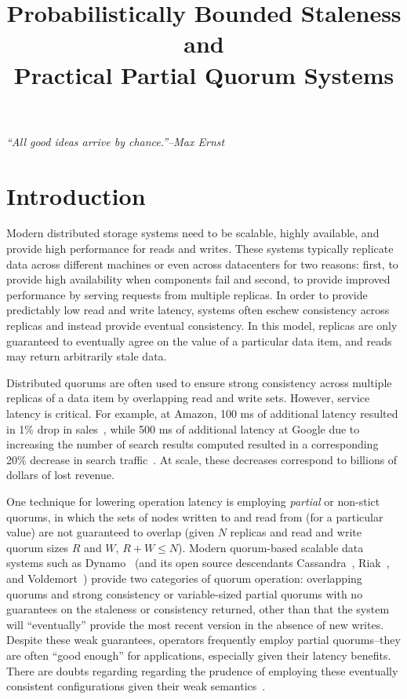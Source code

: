 \documentclass{vldb}
\title{Probabilistically Bounded Staleness and\\ Practical Partial Quorum Systems}
\begin{document}

\maketitle

\noindent\textit{``All good ideas arrive by chance.''--Max Ernst}



\section{Introduction}

Modern distributed storage systems need to be scalable, highly
available, and provide high performance for reads and writes.  These
systems typically replicate data across different machines or even
across datacenters for two reasons: first, to provide high
availability when components fail and second, to provide improved
performance by serving requests from multiple replicas.  In order to
provide predictably low read and write latency, systems often eschew
consistency across replicas and instead provide eventual
consistency. In this model, replicas are only guaranteed to eventually
agree on the value of a particular data item, and reads may return
arbitrarily stale data.

Distributed quorums are often used to ensure strong consistency across
multiple replicas of a data item by overlapping read and write
sets. However, service latency is critical. For example, at Amazon,
100 ms of additional latency resulted in 1\% drop in
sales~\cite{amazon-latency}, while 500 ms of additional latency at
Google due to increasing the number of search results computed
resulted in a corresponding 20\% decrease in search
traffic~\cite{google-talk}.  At scale, these decreases correspond to
billions of dollars of lost revenue.

One technique for lowering operation latency is employing
\textit{partial} or non-stict quorums, in which the sets of nodes
written to and read from (for a particular value) are not guaranteed
to overlap (given $N$ replicas and read and write quorum sizes $R$ and
$W$, $R+W \leq N$).  Modern quorum-based scalable data systems such as
Dynamo~\cite{dynamo} (and its open source descendants
Cassandra~\cite{cassandra}, Riak~\cite{riak}, and
Voldemort~\cite{voldemort}) provide two categories of quorum
operation: overlapping quorums and strong consistency or
variable-sized partial quorums with no guarantees on the staleness or
consistency returned, other than that the system will ``eventually''
provide the most recent version in the absence of new writes.  Despite
these weak guarantees, operators frequently employ partial
quorums--they are often ``good enough'' for applications, especially
given their latency benefits.  There are doubts regarding regarding
the prudence of employing these eventually consistent configurations
given their weak semantics~\cite{hamilton-cap, cops, walter}.
\end{document}
